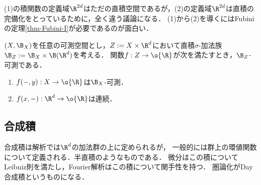 \documentclass[uplatex, dvipdfmx]{jsreport}
\begin{document}
\begin{remarks}[2つの関数は定義域が違う]
    (1)の積関数の定義域$\R^{2d}$はただの直積空間であるが，(2)の定義域$\R^{2d}$は直積の完備化をとっているために，全く違う議論になる．
    (1)から(2)を導くにはFubiniの定理\ref{thm-Fubini-I}が必要であるのが面白い．
\end{remarks}

\begin{theorem}[直積の普遍性の破れ]
    $(X,\B_X)$を任意の可測空間とし，$Z:=X\times\R^d$において直積$\sigma$-加法族$\B_Z:=\B_X\times\B(\R^d)$を考える．
    関数$f:Z\to\o{\R}$が次を満たすとき，$\B_Z$-可測である．
    \begin{enumerate}
        \item $f(-,y):X\to\o{\R}$は$\B_X$-可測．
        \item $f(x,-):\R^d\to\o{\R}$は連続．
    \end{enumerate}
\end{theorem}

\subsection{合成積}

\begin{tcolorbox}[colframe=ForestGreen, colback=ForestGreen!10!white,breakable,colbacktitle=ForestGreen!40!white,coltitle=black,fonttitle=\bfseries\sffamily,
title=]
    合成積は解析では$\R^d$の加法群の上に定められるが，
    一般的には群上の環値関数について定義される．半直積のようなものである．
    微分はこの積についてLeibniz則を満たし，Fourier解析はこの積について関手性を持つ．
    圏論化がDay合成積というものになる．
\end{tcolorbox}
\end{document}
